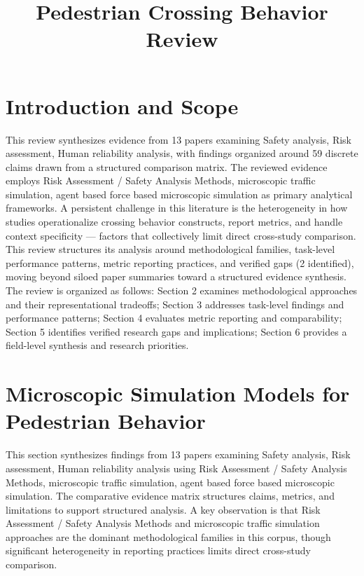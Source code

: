 \documentclass{article}
\title{Pedestrian Crossing Behavior Review}
\begin{document}
\maketitle
\section{Introduction and Scope}
This review synthesizes evidence from 13 papers examining Safety analysis, Risk assessment, Human reliability analysis, with findings organized around 59 discrete claims drawn from a structured comparison matrix. The reviewed evidence employs Risk Assessment / Safety Analysis Methods, microscopic traffic simulation, agent based force based microscopic simulation as primary analytical frameworks. A persistent challenge in this literature is the heterogeneity in how studies operationalize crossing behavior constructs, report metrics, and handle context specificity — factors that collectively limit direct cross-study comparison. This review structures its analysis around methodological families, task-level performance patterns, metric reporting practices, and verified gaps (2 identified), moving beyond siloed paper summaries toward a structured evidence synthesis. The review is organized as follows: Section 2 examines methodological approaches and their representational tradeoffs; Section 3 addresses task-level findings and performance patterns; Section 4 evaluates metric reporting and comparability; Section 5 identifies verified research gaps and implications; Section 6 provides a field-level synthesis and research priorities.

\section{Microscopic Simulation Models for Pedestrian Behavior}
This section synthesizes findings from 13 papers examining Safety analysis, Risk assessment, Human reliability analysis using Risk Assessment / Safety Analysis Methods, microscopic traffic simulation, agent based force based microscopic simulation. The comparative evidence matrix structures claims, metrics, and limitations to support structured analysis. A key observation is that Risk Assessment / Safety Analysis Methods and microscopic traffic simulation approaches are the dominant methodological families in this corpus, though significant heterogeneity in reporting practices limits direct cross-study comparison.
\end{document}
